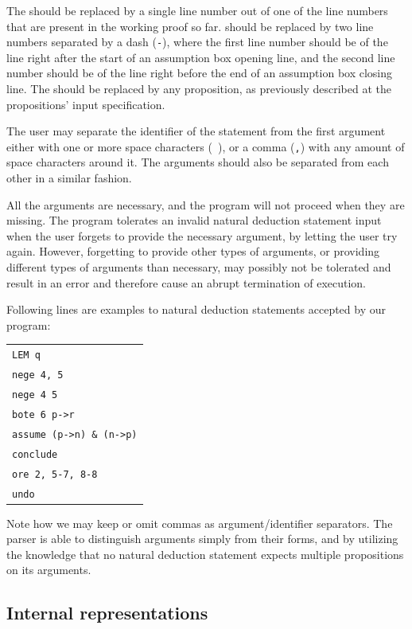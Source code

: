 \documentclass{article}
\begin{document}
The \AN{} should be replaced by a single line number out of one of the
line numbers that are present in the working proof so far. \AR{} should
be replaced by two line numbers separated by a dash (\verb|-|), where
the first line number should be of the line right after the start of
an assumption box opening line, and the second line number should be of
the line right before the end of an assumption box closing line. 
The \AF{} should be replaced by any proposition, as previously described
at the propositions' input specification.

The user may separate the identifier of the statement from the first argument
either with one or more space characters (\verb| |), or a comma (\verb|,|)
with any amount of space characters around it. The arguments should also
be separated from each other in a similar fashion.

All the arguments are necessary, and the program will not proceed when
they are missing. The program tolerates an invalid natural deduction statement
input when the user forgets to provide the necessary \AF{} argument, by letting
the user try again. However, forgetting to provide other types of arguments,
or providing different types of arguments than necessary, may possibly not
be tolerated and result in an error and therefore cause an abrupt
termination of execution.

Following lines are examples to natural deduction statements accepted by
our program:

\begin{center}
	\begin{tabular}{l}
		\verb^LEM q^\\
		\verb^nege 4, 5^\\
		\verb^nege 4 5^\\
		\verb^bote 6 p->r^\\
		\verb^assume (p->n) & (n->p)^\\
		\verb^conclude^\\
		\verb^ore 2, 5-7, 8-8^\\
		\verb^undo^
	\end{tabular}
\end{center}

Note how we may keep or omit commas as argument/identifier separators.
The parser is able to distinguish arguments simply from their forms,
and by utilizing the knowledge that no natural deduction statement
expects multiple propositions on its arguments.

\subsection{Internal representations}\label{sec:inrep}
\end{document}
